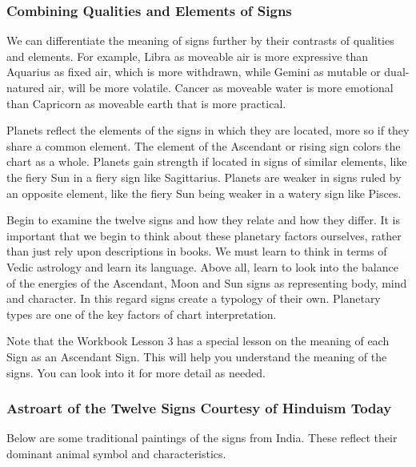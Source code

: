 \subsubsection{Combining Qualities and Elements of Signs}

 

We can differentiate the meaning of signs further by their contrasts of qualities and elements. For example, Libra as moveable air is more expressive than Aquarius as fixed air, which is more withdrawn, while Gemini as mutable or dual-natured air, will be more volatile. Cancer as moveable water is more emotional than Capricorn as moveable earth that is more practical.

 

Planets reflect the elements of the signs in which they are located, more so if they share a common element. The element of the Ascendant or rising sign colors the chart as a whole. Planets gain strength if located in signs of similar elements, like the fiery Sun in a fiery sign like Sagittarius. Planets are weaker in signs ruled by an opposite element, like the fiery Sun being weaker in a watery sign like Pisces.

 

Begin to examine the twelve signs and how they relate and how they differ. It is important that we begin to think about these planetary factors ourselves, rather than just rely upon descriptions in books. We must learn to think in terms of Vedic astrology and learn its language. Above all, learn to look into the balance of the energies of the Ascendant, Moon and Sun signs as representing body, mind and character. In this regard signs create a typology of their own. Planetary types are one of the key factors of chart interpretation.

Note that the Workbook Lesson 3 has a special lesson on the meaning of each Sign as an Ascendant Sign. This will help you understand the meaning of the signs. You can look into it for more detail as needed.

 

\subsubsection{Astroart of the Twelve Signs Courtesy of Hinduism Today}
 

Below are some traditional paintings of the signs from India. These reflect their dominant animal symbol and characteristics.

